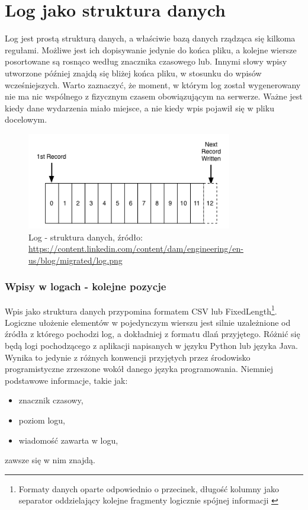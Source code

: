 \section{Log jako struktura danych}
\label{chapter:logs:structure}
    Log jest prostą strukturą danych, a właściwie bazą danych rządząca się kilkoma regułami.
    Możliwe jest ich dopisywanie jedynie do końca pliku, a kolejne wiersze posortowane są rosnąco
    według znacznika czasowego lub. Innymi słowy wpisy utworzone później znajdą się bliżej końca pliku,
    w stosunku do wpisów wcześniejszych. Warto zaznaczyć, że moment, w którym log został wygenerowany nie ma
    nic wspólnego z fizycznym czasem obowiązującym na serwerze. Ważne jest kiedy dane wydarzenia
    miało miejsce, a nie kiedy wpis pojawił się w pliku docelowym.
    
     \begin{figure}[H]
         \centering
         \includegraphics[width=0.80\textwidth]{images/log_file_structure}
         \caption[Log jako struktura danych]{
             Log - struktura danych, źródło: \url{https://content.linkedin.com/content/dam/engineering/en-us/blog/migrated/log.png}
            }
            \label{chapter:logs:history:log_file_as_data_structure_picture}
    \end{figure}

    \subsubsection{Wpisy w logach - kolejne pozycje}
    \label{chapter:logs:structure:record_structure}
    Wpis jako struktura danych przypomina formatem CSV lub FixedLength\footnote{Formaty danych oparte odpowiednio o przecinek, długość kolumny 
        jako separator oddzielający kolejne fragmenty logicznie spójnej informacji \cite{csv_definition}}. 
    Logiczne ułożenie elementów w pojedynczym wierszu jest silnie uzależnione od źródła z którego pochodzi log, 
    a dokładniej z formatu dlań przyjętego. Różnić się będą logi pochodzącego z aplikacji napisanych w języku Python
    lub języka Java. Wynika to jedynie z różnych konwencji przyjętych przez środowisko 
    programistyczne zrzeszone wokół danego języka programowania. Niemniej podstawowe informacje, takie jak:
    \begin{itemize}
        \item znacznik czasowy,
        \item poziom logu,
        \item wiadomość zawarta w logu,
    \end{itemize}
    zawsze się w nim znajdą. 
    
